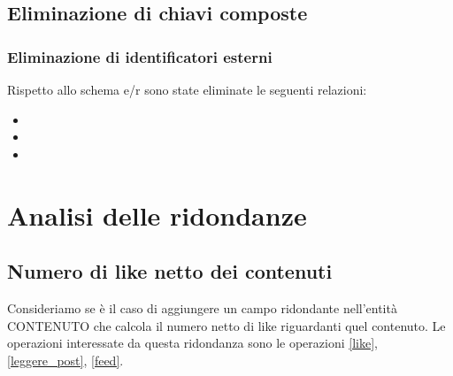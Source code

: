 \documentclass[a4paper,12pt]{report}
\begin{document}
\subsection{Eliminazione di chiavi composte}
\subsubsection{Eliminazione di identificatori esterni}
Rispetto allo schema e/r sono state eliminate  le seguenti relazioni:
\begin{itemize}
  \item  
  \item 
  \item
\end{itemize}
\section{Analisi delle ridondanze}
\subsection{Numero di like netto dei contenuti}
Consideriamo se è il caso di aggiungere un campo ridondante nell'entità CONTENUTO che calcola il numero netto di like riguardanti quel contenuto. Le operazioni interessate da questa ridondanza sono le operazioni \ref{like}, \ref{leggere_post}, \ref{feed}.
\end{document}
